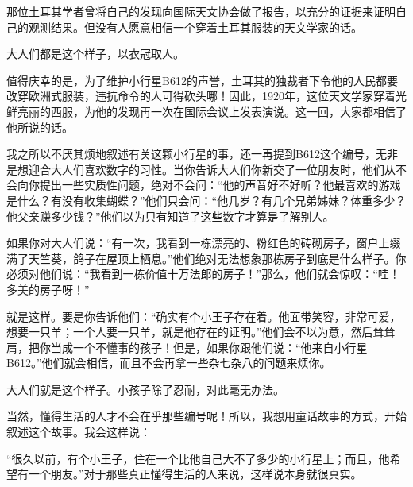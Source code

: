 {\startalignment[center]
 \stopalignment}

那位土耳其学者曾将自己的发现向国际天文协会做了报告，以充分的证据来证明自己的观测结果。但没有人愿意相信一个穿着土耳其服装的天文学家的话。

{\startalignment[center]
 \stopalignment}

大人们都是这个样子，以衣冠取人。

值得庆幸的是，为了维护小行星B612的声誉，土耳其的独裁者下令他的人民都要改穿欧洲式服装，违抗命令的人可得砍头哪！因此，1920年，这位天文学家穿着光鲜亮丽的西服，为他的发现再一次在国际会议上发表演说。这一回，大家都相信了他所说的话。

我之所以不厌其烦地叙述有关这颗小行星的事，还一再提到B612这个编号，无非是想迎合大人们喜欢数字的习性。当你告诉大人们你新交了一位朋友时，他们从不会向你提出一些实质性问题，绝对不会问：“他的声音好不好听？他最喜欢的游戏是什么？有没有收集蝴蝶？”他们只会问：“他几岁？有几个兄弟姊妹？体重多少？他父亲赚多少钱？”他们以为只有知道了这些数字才算是了解别人。

{\startalignment[center]
 \stopalignment}

如果你对大人们说：“有一次，我看到一栋漂亮的、粉红色的砖砌房子，窗户上缀满了天竺葵，鸽子在屋顶上栖息。”他们绝对无法想象那栋房子到底是什么样子。你必须对他们说：“我看到一栋价值十万法郎的房子！”那么，他们就会惊叹：“哇！多美的房子呀！”

就是这样。要是你告诉他们：“确实有个小王子存在着。他面带笑容，非常可爱，想要一只羊；一个人要一只羊，就是他存在的证明。”他们会不以为意，然后耸耸肩，把你当成一个不懂事的孩子！但是，如果你跟他们说：“他来自小行星B612。”他们就会相信，而且不会再拿一些杂七杂八的问题来烦你。

大人们就是这个样子。小孩子除了忍耐，对此毫无办法。

当然，懂得生活的人才不会在乎那些编号呢！所以，我想用童话故事的方式，开始叙述这个故事。我会这样说：

“很久以前，有个小王子，住在一个比他自己大不了多少的小行星上；而且，他希望有一个朋友。”对于那些真正懂得生活的人来说，这样说本身就很真实。


